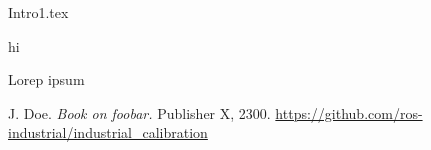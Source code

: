 \documentclass{ctuthesis}
\begin{document}
\maketitle
{Intro1.tex}


hi \cite{2}




Lorep ipsum \cite{doe}



\begin{thebibliography}{1}

 J. Doe. \emph{Book on foobar.} Publisher X,
2300.
\url{https://github.com/ros-industrial/industrial_calibration}



\end{thebibliography}
\end{document}
